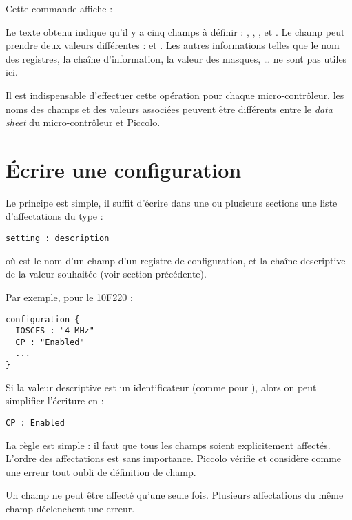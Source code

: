 Cette commande affiche :


Le texte obtenu indique qu'il y a cinq champs à définir : , , ,  et . Le champ  peut prendre deux valeurs différentes :  et . Les autres informations telles que le nom des registres, la chaîne d'information, la valeur des masques, … ne sont pas utiles ici.

Il est indispensable d'effectuer cette opération pour chaque micro-contrôleur, les noms des champs et des valeurs associées peuvent être différents entre le \emph{data sheet} du micro-contrôleur et Piccolo.

\section{Écrire une configuration}

Le principe est simple, il suffit d’écrire dans une ou plusieurs sections  une liste d’affectations du type :

\begin{lstlisting}[language=piccolo]
setting : description
\end{lstlisting}

où  est le nom d’un champ d’un registre de configuration, et  la chaîne descriptive de la valeur souhaitée (voir section précédente).

Par exemple, pour le 10F220 :

\begin{lstlisting}[language=piccolo]
configuration {
  IOSCFS : "4 MHz"
  CP : "Enabled"
  ...
}
\end{lstlisting}

Si la valeur descriptive est un identificateur (comme pour ), alors on peut simplifier l’écriture en :

\begin{lstlisting}[language=piccolo]
  CP : Enabled
\end{lstlisting}

La règle est simple : il faut que tous les champs soient explicitement affectés. L’ordre des affectations est sans importance. Piccolo vérifie et considère comme une erreur tout oubli de définition de champ.

Un champ ne peut être affecté qu’une seule fois. Plusieurs affectations du même champ déclenchent une erreur.


